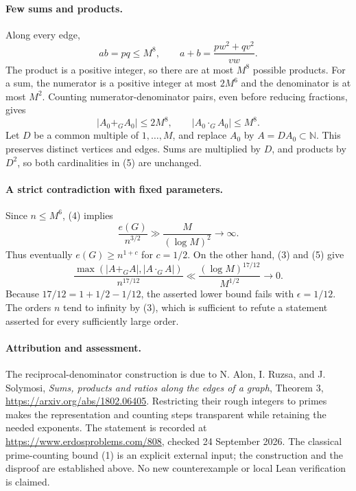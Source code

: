\paragraph{Few sums and products.}
Along every edge,
\[
 ab=pq\leq M^8,\qquad
 a+b=\frac{pw^2+qv^2}{vw}.
\]
The product is a positive integer, so there are at most \(M^8\) possible products. For a sum, the numerator is a positive integer at most \(2M^6\) and the denominator is at most \(M^2\). Counting numerator-denominator pairs, even before reducing fractions, gives
\[
 |A_0+_GA_0|\leq2M^8,\qquad
 |A_0\cdot_GA_0|\leq M^8.
\tag{5}
\]
Let \(D\) be a common multiple of \(1,\ldots,M\), and replace \(A_0\) by \(A=DA_0\subset\mathbb N\). This preserves distinct vertices and edges. Sums are multiplied by \(D\), and products by \(D^2\), so both cardinalities in (5) are unchanged.

\paragraph{A strict contradiction with fixed parameters.}
Since \(n\leq M^6\), (4) implies
\[
 \frac{e(G)}{n^{3/2}}\gg\frac{M}{(\log M)^2}\longrightarrow\infty.
\]
Thus eventually \(e(G)\geq n^{1+c}\) for \(c=1/2\). On the other hand, (3) and (5) give
\[
 \frac{\max(|A+_GA|,|A\cdot_GA|)}{n^{17/12}}
 \ll\frac{(\log M)^{17/12}}{M^{1/2}}
 \longrightarrow0.
\]
Because \(17/12=1+1/2-1/12\), the asserted lower bound fails with \(\epsilon=1/12\). The orders \(n\) tend to infinity by (3), which is sufficient to refute a statement asserted for every sufficiently large order.

\paragraph{Attribution and assessment.}
The reciprocal-denominator construction is due to N. Alon, I. Ruzsa, and J. Solymosi, \emph{Sums, products and ratios along the edges of a graph}, Theorem 3, \url{https://arxiv.org/abs/1802.06405}. Restricting their rough integers to primes makes the representation and counting steps transparent while retaining the needed exponents. The statement is recorded at \url{https://www.erdosproblems.com/808}, checked 24 September 2026. The classical prime-counting bound (1) is an explicit external input; the construction and the disproof are established above. No new counterexample or local Lean verification is claimed.
